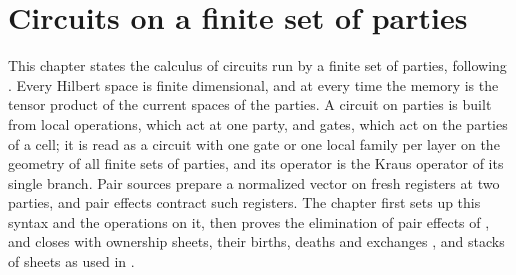 \chapter{Circuits on a finite set of parties}
\label{ch:party}

This chapter states the calculus of circuits run by a finite set of parties,
following \cite[Sections~5--7]{OpenAI2026PolynomialPEPS}. Every Hilbert space
is finite dimensional, and at every time the memory is the tensor product of
the current spaces of the parties. A circuit on parties is built from local
operations, which act at one party, and gates, which act on the parties of a
cell; it is read as a circuit with one gate or one local family per layer on
the geometry of all finite sets of parties, and its operator is the Kraus
operator of its single branch. Pair sources prepare a normalized vector on
fresh registers at two parties, and pair effects contract such registers. The
chapter first sets up this syntax and the operations on it, then proves the
elimination of pair effects of \cite[Lemma~5.1]{OpenAI2026PolynomialPEPS}, and
closes with ownership sheets, their births, deaths and exchanges
\cite[Lemmas~6.5 and~6.6]{OpenAI2026PolynomialPEPS}, and stacks of sheets as
used in \cite[Proposition~7.1]{OpenAI2026PolynomialPEPS}.






